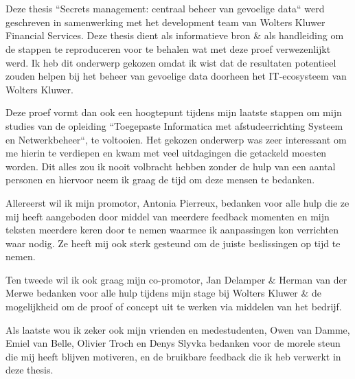 
\chapter*{}
\label{ch:voorwoord}



Deze thesis ``Secrets management: centraal beheer van gevoelige data`` werd geschreven in samenwerking met het development team van Wolters Kluwer Financial Services. Deze thesis dient als informatieve bron \& als handleiding om de stappen te reproduceren voor te behalen wat met deze proef verwezenlijkt werd. Ik heb dit onderwerp gekozen omdat ik wist dat de resultaten potentieel zouden helpen bij het beheer van gevoelige data doorheen het IT-ecosysteem van Wolters Kluwer.

Deze proef vormt dan ook een hoogtepunt tijdens mijn laatste stappen om mijn studies van de opleiding ``Toegepaste Informatica met afstudeerrichting Systeem en Netwerkbeheer``, te voltooien. Het gekozen onderwerp was zeer interessant om me hierin te verdiepen en kwam met veel uitdagingen die getackeld moesten worden. Dit alles zou ik nooit volbracht hebben zonder de hulp van een aantal personen en hiervoor neem ik graag de tijd om deze mensen te bedanken.

Allereerst wil ik mijn promotor, Antonia Pierreux, bedanken voor alle hulp die ze mij heeft aangeboden door middel van meerdere feedback momenten en mijn teksten meerdere keren door te nemen waarmee ik aanpassingen kon verrichten waar nodig. Ze heeft mij ook sterk gesteund om de juiste beslissingen op tijd te nemen.

Ten tweede wil ik ook graag mijn co-promotor, Jan Delamper \& Herman van der Merwe bedanken voor alle hulp tijdens mijn stage bij Wolters Kluwer \& de mogelijkheid om de proof of concept uit te werken via middelen van het bedrijf.

Als laatste wou ik zeker ook mijn vrienden en medestudenten, Owen van Damme, Emiel van Belle, Olivier Troch en Denys Slyvka  bedanken voor de morele steun die mij heeft blijven motiveren, en de bruikbare feedback die ik heb verwerkt in deze thesis.